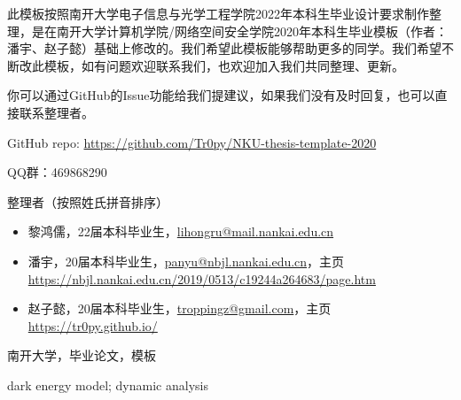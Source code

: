 

\begin{zhaiyao}
\begin{spacing}{1.5}
{


此模板按照南开大学电子信息与光学工程学院2022年本科生毕业设计要求制作整理，是在南开大学计算机学院/网络空间安全学院2020年本科生毕业模板（作者：潘宇、赵子懿）基础上修改的。我们希望此模板能够帮助更多的同学。我们希望不断改此模板，如有问题欢迎联系我们，也欢迎加入我们共同整理、更新。

你可以通过GitHub的Issue功能给我们提建议，如果我们没有及时回复，也可以直接联系整理者。

GitHub repo: \url{https://github.com/Tr0py/NKU-thesis-template-2020}

QQ群：469868290

整理者（按照姓氏拼音排序）
\begin{itemize}
    \item 黎鸿儒，22届本科毕业生，\url{lihongru@mail.nankai.edu.cn}
    \item 潘宇，20届本科毕业生，\url{panyu@nbjl.nankai.edu.cn}，主页\url{https://nbjl.nankai.edu.cn/2019/0513/c19244a264683/page.htm}
    \item 赵子懿，20届本科毕业生，\url{troppingz@gmail.com}，主页\url{https://tr0py.github.io/}
\end{itemize}

\quad
}
\end{spacing}
\end{zhaiyao}




\begin{guanjianci}
南开大学，毕业论文，模板
\end{guanjianci}



\begin{abstract}
\begin{spacing}{1.5}
Since 1998, two independent supernova research groups have discovered that the universe is accelerating, and the dark energy has become a hot topic in cosmology. 


\quad
\end{spacing}
\end{abstract}


\begin{keywords}
dark energy model; dynamic analysis
\end{keywords} 